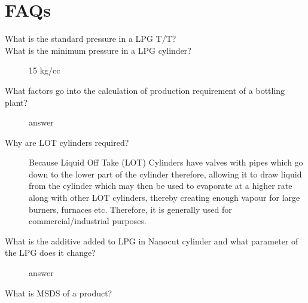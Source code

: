 \documentclass{report}
\begin{document}
	\section{FAQs}
	\begin{description}
		\item[What is the standard pressure in a LPG T/T?] 
		\item[What is the minimum pressure in a LPG cylinder?] 15 kg/cc
		\item[What factors go into the calculation of production requirement of a bottling plant?] answer
		\item[Why are LOT cylinders required?] Because Liquid Off Take (LOT) Cylinders have valves with pipes which go down to the lower part of the cylinder therefore, allowing it to draw liquid from the cylinder which may then be used to evaporate at a higher rate along with other LOT cylinders, thereby creating enough vapour for large burners, furnaces etc. Therefore, it is generally used for commercial/industrial purposes.
		\item[What is the additive added to LPG in Nanocut cylinder and what parameter of the LPG does it change?] answer
		\item[What is MSDS of a product?]
	\end{description}
	\clearpage
	\pagebreak
\end{document}
